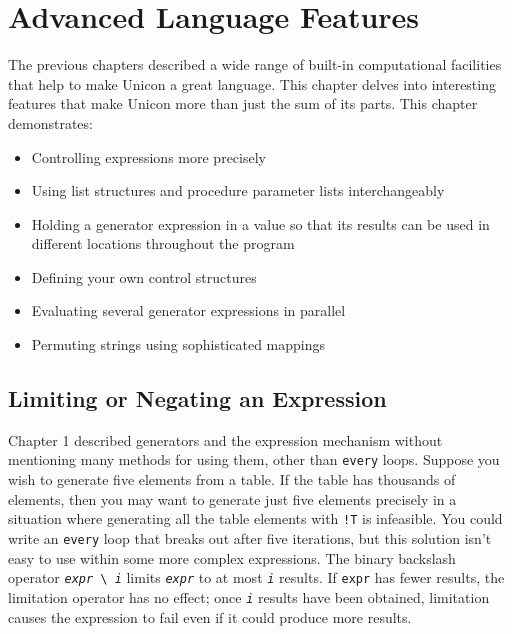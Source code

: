 \chapter{Advanced Language Features}

The previous chapters described a wide range of built-in computational
facilities that help to make Unicon a great language.
This chapter delves into interesting features that make Unicon
more than just the sum of its parts. This chapter demonstrates:

\begin{itemize}\itemsep0pt
\item Controlling expressions more precisely
\item Using list structures and procedure parameter lists
interchangeably
\item Holding a generator expression in a value so that
its results can be used in different locations throughout the program
\item Defining your own control structures
\item Evaluating several generator expressions in parallel
\item Permuting strings using sophisticated mappings
\end{itemize}

\section{Limiting or Negating an Expression}

Chapter 1 described generators and the
expression mechanism without mentioning many methods for using them,
other than \texttt{every} loops. Suppose you wish to generate five
elements from a table. If the table has thousands of elements, then you
may want to generate just five elements precisely in a situation where
generating all the table elements with \texttt{!T} is infeasible. You
could write an \texttt{every} loop that breaks out after five
iterations, but this solution isn't easy to use within
some more complex expressions. The binary backslash operator
\texttt{\textit{expr}}\texttt{ {\textbackslash} }\texttt{\textit{i}}
limits \texttt{\textit{expr}} to at most \texttt{\textit{i}} results.
If \texttt{expr} has fewer results, the limitation operator has no
effect; once \texttt{\textit{i}} results have been obtained, limitation
causes the expression to fail even if it
could produce more results.

